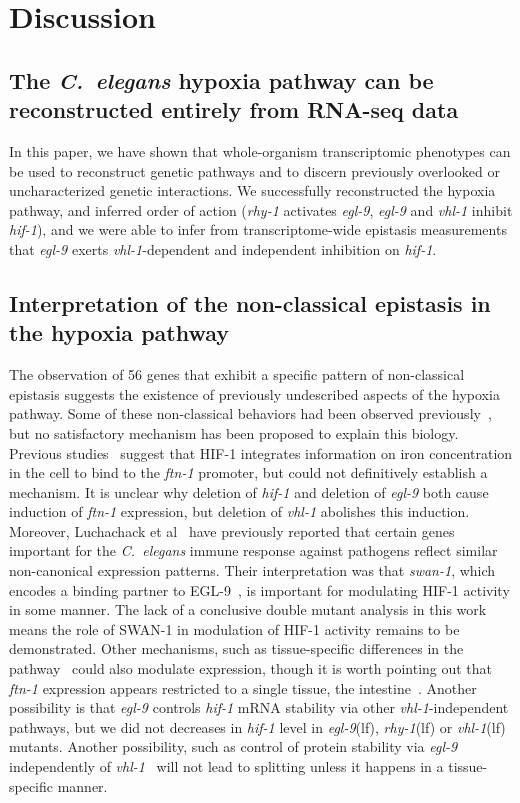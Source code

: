 \documentclass[9pt,twocolumn,twoside,lineno]{pnas-new}
\newcommand{\cel}{\emph{C.~elegans}}
\newcommand{\gene}[1]{\mbox{\emph{#1}}}
\newcommand{\ftna}{\gene{ftn-1}}
\newcommand{\egl}{\gene{egl-9}(lf)}
\newcommand{\rhy}{\gene{rhy-1}(lf)}
\newcommand{\vhl}{\gene{vhl-1}(lf)}
\newcommand{\eglp}{EGL-9}
\newcommand{\hifp}{HIF-1}
\newcommand{\hifohtargets}{56}
\begin{document}
\section*{Discussion}
\label{sec:discussion}
\subsection*{The \cel{} hypoxia pathway can be reconstructed entirely from
             RNA-seq data}
In this paper, we have shown that whole-organism transcriptomic phenotypes
can be used to reconstruct genetic pathways and to discern previously overlooked
or uncharacterized genetic interactions. We successfully reconstructed the hypoxia
pathway, and inferred order of action (\gene{rhy-1} activates \gene{egl-9},
\gene{egl-9} and \gene{vhl-1} inhibit \gene{hif-1}), and we were able to infer
from transcriptome-wide epistasis measurements that \gene{egl-9} exerts
\gene{vhl-1}-dependent and independent inhibition on \gene{hif-1}.

\subsection*{Interpretation of the non-classical epistasis in the hypoxia pathway}
The observation of \hifohtargets{} genes that exhibit a specific pattern of
non-classical epistasis suggests the existence of previously undescribed aspects
of the hypoxia pathway. Some of these non-classical behaviors had been observed
previously~\cite{Ackerman2012,Romney2011,Luhachack2012}, but no satisfactory
mechanism has been proposed to explain this biology. Previous
studies~\cite{Romney2011,Ackerman2012} suggest that \hifp{} integrates
information on iron concentration in the cell to bind to the \ftna{} promoter,
but could not definitively establish a mechanism. It is unclear why deletion of
\gene{hif-1} and deletion of \gene{egl-9} both cause induction of \ftna{}
expression, but deletion of \gene{vhl-1} abolishes this induction. Moreover,
Luchachack et al~\cite{Luhachack2012} have previously reported that certain
genes important for the \cel{} immune response against pathogens reflect similar
non-canonical expression patterns. Their interpretation was that \gene{swan-1},
which encodes a binding partner to \eglp{}~\cite{Shao2010}, is important for
modulating \hifp{} activity in some manner. The lack of a conclusive double
mutant analysis in this work means the role of SWAN-1 in modulation of \hifp{}
activity remains to be demonstrated. Other mechanisms, such as tissue-specific
differences in the pathway~\cite{Budde2010} could also modulate expression,
though it is worth pointing out that \ftna{} expression appears restricted to a
single tissue, the intestine~\cite{Kim2004}. Another possibility is that
\gene{egl-9} controls \gene{hif-1} mRNA stability via other
\gene{vhl-1}-independent pathways, but we did not decreases in \gene{hif-1}
level in \egl{}, \rhy{} or \vhl{} mutants. Another possibility, such as control
of protein stability via \gene{egl-9} independently of
\gene{vhl-1}~\cite{Chintala2012} will not lead to splitting unless it happens in
a tissue-specific manner.
\end{document}
